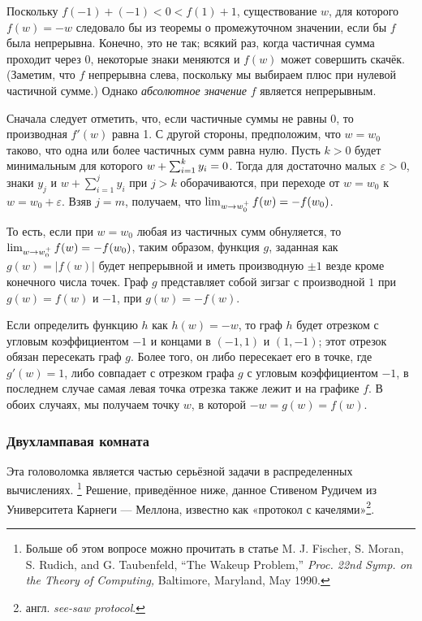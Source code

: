 Поскольку  $f(-1)+(-1)<0 <f(1)+ 1$, существование $w$, для которого $f(w)=-w$ следовало бы из теоремы о промежуточном значении, если бы $f$ была непрерывна.
Конечно, это не так; всякий раз, когда частичная сумма проходит через 0, некоторые знаки меняются и $f(w)$ может совершить скачёк.
(Заметим, что $f$ непрерывна слева, поскольку мы выбираем плюс при нулевой частичной сумме.)
Однако \emph{абсолютное значение} $f$ является непрерывным.

Сначала следует отметить, что, если частичные суммы не равны $0$, то производная $f'(w)$ равна 1.
С другой стороны, предположим, что $w = w_0$ таково, что одна или более частичных сумм равна нулю.
Пусть $k > 0$ будет минимальным для которого $w+\sum_{i=1}^{k}y_i\z=0$.
Тогда для достаточно малых $\varepsilon>0$,
знаки $y_j$ и $w+\sum_{i=1}^{j}y_i$ при $j>k$ оборачиваются, при переходе от $w = w_0$ к $w = w_0+\varepsilon$.
Взяв $j = m$, получаем, что $\lim_{w\to w_0^+}f(w)\z=-f(w_0)$.

То есть, если при $w=w_0$ любая из частичных сумм обнуляется, то $\lim_{w\to w_0^+}f(w)\z=-f(w_0)$, таким образом, функция $g$, заданная как $g(w) =|f (w)|$ будет непрерывной и иметь производную $\pm1$ везде кроме конечного числа точек.
Граф $g$ представляет собой зигзаг с производной $1$ при $g (w) = f (w)$ и $-1$, при $g (w) = - f (w)$.

Если определить функцию $h$ как $h (w) = -w$, то граф $h$ будет отрезком с угловым коэффициентом $-1$ и концами в $(-1,1)$ и $(1,-1)$;
этот отрезок обязан пересекать граф $g$.
Более того, он либо пересекает его в точке, где $g'(w) = 1$, либо совпадает с отрезком графа $g$ с угловым коэффициентом $-1$, в последнем случае самая левая точка отрезка также лежит и на графике $f$.
В обоих случаях, мы получаем точку $w$, в которой $-w = g (w) = f (w)$. \heart

\subsubsection*{Двухлампавая комната}

Эта головоломка является частью серьёзной задачи в распределенных вычислениях.%
\footnote{Больше об этом вопросе можно прочитать в статье M. J. Fischer, S. Moran, S. Rudich, and G. Taubenfeld, ``The Wakeup Problem,'' \emph{Proc. 22nd Symp. on the Theory of Computing,} Baltimore, Maryland, May 1990.}
Решение, приведённое ниже, данное Стивеном Рудичем из Университета Карнеги --- Меллона, известно как «протокол с качелями»\footnote{англ. \emph{see-saw protocol}.}.

